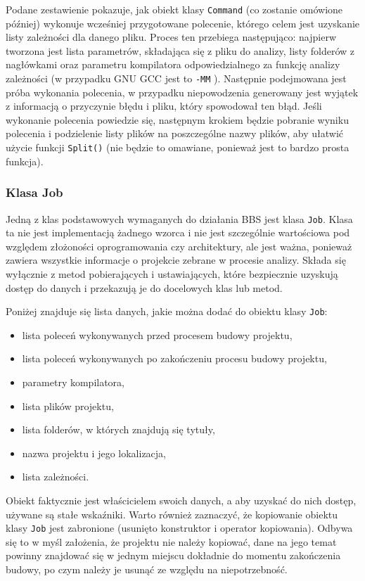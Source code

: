 Podane zestawienie pokazuje, jak obiekt klasy \texttt{Command} (co zostanie omówione później) wykonuje wcześniej przygotowane polecenie, którego celem jest uzyskanie listy zależności dla danego pliku. Proces ten przebiega następująco: najpierw tworzona jest lista parametrów, składająca się z pliku do analizy, listy folderów z nagłówkami oraz parametru kompilatora odpowiedzialnego za funkcję analizy zależności (w przypadku GNU GCC jest to \texttt{-MM} \cite{gcc} ). Następnie podejmowana jest próba wykonania polecenia, w przypadku niepowodzenia generowany jest wyjątek z informacją o przyczynie błędu i pliku, który spowodował ten błąd. Jeśli wykonanie polecenia powiedzie się, następnym krokiem będzie pobranie wyniku polecenia i podzielenie listy plików na poszczególne nazwy plików, aby ułatwić użycie funkcji \texttt{Split()} (nie będzie to omawiane, ponieważ jest to bardzo prosta funkcja).

\subsubsection{Klasa Job}

Jedną z klas podstawowych wymaganych do działania BBS jest klasa \texttt{Job}. Klasa ta nie jest implementacją żadnego wzorca i nie jest szczególnie wartościowa pod względem złożoności oprogramowania czy architektury, ale jest ważna, ponieważ zawiera wszystkie informacje o projekcie zebrane w procesie analizy. Składa się wyłącznie z metod pobierających i ustawiających, które bezpiecznie uzyskują dostęp do danych i przekazują je do docelowych klas lub metod.

Poniżej znajduje się lista danych, jakie można dodać do obiektu klasy \texttt{Job}:
\begin{itemize}
    \item lista poleceń wykonywanych przed procesem budowy projektu,
    \item lista poleceń wykonywanych po zakończeniu procesu budowy projektu,
    \item parametry kompilatora,
    \item lista plików projektu,
    \item lista folderów, w których znajdują się tytuły,
    \item nazwa projektu i jego lokalizacja,
    \item lista zależności.
\end{itemize}

Obiekt faktycznie jest właścicielem swoich danych, a aby uzyskać do nich dostęp, używane są stałe wskaźniki. Warto również zaznaczyć, że kopiowanie obiektu klasy \texttt{Job} jest zabronione (usunięto konstruktor i operator kopiowania). Odbywa się to w myśl założenia, że projektu nie należy kopiować, dane na jego temat powinny znajdować się w jednym miejscu dokładnie do momentu zakończenia budowy, po czym należy je usunąć ze względu na niepotrzebność.

